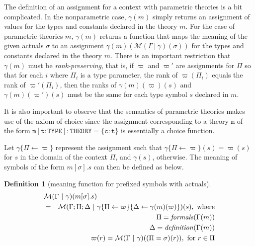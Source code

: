 \documentclass [12pt,twoside]{cslreport}
\newcommand{\thmbox}
   {{\ \hfill\hbox{%
      \vrule width1.0ex height1.0ex
   }\parfillskip 0pt }}
\newcommand{\Mgamma}[1]{{\mathcal M}(\Gamma\vbar\gamma)(#1)}
\newcommand{\vbar}{\ |\ }
\newtheorem{definition}{Definition}
\newenvironment{Defn}[1]{\begin{definition}[#1]\label{defn:#1}}{
\thmbox\end{definition}}
\begin{document}
The definition of an assignment for a context with parametric theories is
a bit complicated.  
In the nonparametric case, $\gamma(m)$ simply returns an
assignment of values for the types and constants declared in the theory
$m$\@.  For the case of parametric theories $m$, $\gamma(m)$  returns a
function that maps the meaning of the given actuals $\sigma$ to
an assignment $\gamma(m)(\Mgamma{\sigma})$ for the  types and
constants declared in the theory $m$\@.   
There is an important restriction that $\gamma(m)$ must be
\emph{rank-preserving}, that is,  if $\varpi$  
and $\varpi'$ are assignments for 
$\Pi$ so that for each $i$ where $\Pi_i$ is a type parameter, the
rank of $\varpi(\Pi_i)$ equals the rank of 
$\varpi'(\Pi_i)$,  then the ranks of $\gamma(m)(\varpi)(s)$
and $\gamma(m)(\varpi')(s)$ must be the same for each type symbol $s$
declared in $m$\@.  

It is also important to observe that the semantics of parametric theories
makes use of the axiom of choice since the assignment corresponding to a
theory $\mathtt{m}$ of the form  $\mathtt{m [t:TYPE]: THEORY =
\{c : t\}}$ is essentially a choice function.  

Let $\gamma\{\Pi \gets \varpi\}$ represent the assignment such that
$\gamma\{\Pi \gets \varpi\}(s) = \varpi(s)$ for $s$
in the domain of the context $\Pi$, and $\gamma(s)$, otherwise\@.  
The meaning of symbols of the form $m[\sigma].s$ can then be defined
as below.
\begin{Defn}{meaning function for prefixed symbols with actuals}
\begin{eqnarray*}
  \lefteqn{\Mgamma{m[\sigma].s}}\\ & = &
\mathcal{M}(\Gamma;\Pi;\Delta \vbar
\gamma\{\Pi\gets\varpi\}\{\Delta\gets\gamma(m)(\varpi)\})(s), \mbox{ where}\\
 & & \Pi = \mathit{formals}(\Gamma(m)) \\
& &      \Delta = \mathit{definition}(\Gamma(m)) \\
& &      \varpi(r) = \Mgamma{(\Pi = \sigma)(r)}, \mbox{ for } r\in \Pi
\end{eqnarray*}
\end{Defn}
\end{document}
